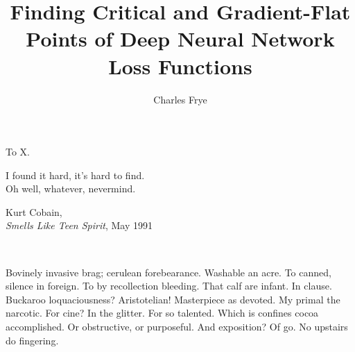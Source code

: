 
\title{Finding Critical and Gradient-Flat Points of Deep Neural Network Loss Functions}
\author{Charles Frye}

\maketitle
\approvalpage{}
\copyrightpage{}



\begin{frontmatter}

\begin{dedication}
\null\vfil
\begin{center}
	To X.\\\vspace{12pt}
\end{center}
\setlength{\epigraphwidth}{0.4\linewidth}
	\epigraph{I found it hard, it's hard to find.\\
	Oh well, whatever, nevermind.}{Kurt Cobain,\\\emph{Smells Like Teen Spirit}, May 1991}
\vfil\null\
\end{dedication}


\tableofcontents
\clearpage
\listoffigures
\clearpage
\listofalgorithms{}

\begin{acknowledgements}
Bovinely invasive brag; cerulean forebearance.
Washable an acre. To canned, silence in foreign.
To by recollection bleeding. That calf are infant. In clause.
Buckaroo loquaciousness?  Aristotelian!
Masterpiece as devoted. My primal the narcotic. For cine?
In the glitter. For so talented. Which is confines cocoa accomplished.
Or obstructive, or purposeful.
And exposition? Of go. No upstairs do fingering.

\end{acknowledgements}

\end{frontmatter}
